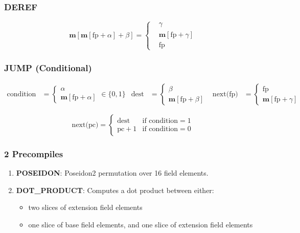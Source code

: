 \documentclass{article}
\theoremstyle{definition}
\begin{document}
\subsubsection{DEREF}

$$
\textbf{m}[\textbf{m}[\text{fp} + \alpha] + \beta] = 
\begin{cases}
& \gamma \\
& \textbf{m}[\text{fp} + \gamma]   \\
& \text{fp}  

\end{cases}
$$

\subsubsection{JUMP (Conditional)}

\begin{align*}
\text{condition} &= 
\begin{cases}
\alpha \\
\textbf{m}[\text{fp} + \alpha]
\end{cases} \in \{0, 1\}
&
\text{dest} &= 
\begin{cases}
\beta \\
\textbf{m}[\text{fp} + \beta]
\end{cases}
&
\text{next(fp)} &= 
\begin{cases}
\text{fp} \\
\textbf{m}[\text{fp} + \gamma]
\end{cases}
\end{align*}

$$
\text{next(pc)} = 
\begin{cases}
\text{dest} & \text{if condition} = 1 \\
\text{pc} + 1 & \text{if condition} = 0
\end{cases}
$$

\subsubsection{2 Precompiles}



\begin{enumerate}
    \item \textbf{POSEIDON}: Poseidon2 permutation over 16 field elements.
    \item \textbf{DOT\_PRODUCT}: Computes a dot product between either:
    \begin{itemize}
        \item two slices of extension field elements
        \item one slice of base field elements, and one slice of extension field elements
    \end{itemize}
\end{enumerate}
\end{document}
